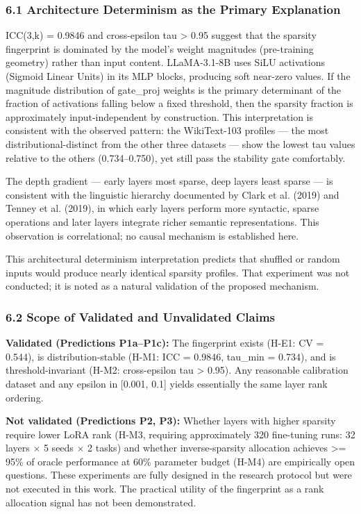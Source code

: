 
\subsubsection{6.1 Architecture Determinism as the Primary Explanation}

ICC(3,k) = 0.9846 and cross-epsilon tau > 0.95 suggest that the sparsity fingerprint is dominated by the model's weight magnitudes (pre-training geometry) rather than input content. LLaMA-3.1-8B uses SiLU activations (Sigmoid Linear Units) in its MLP blocks, producing soft near-zero values. If the magnitude distribution of gate\_proj weights is the primary determinant of the fraction of activations falling below a fixed threshold, then the sparsity fraction is approximately input-independent by construction. This interpretation is consistent with the observed pattern: the WikiText-103 profiles --- the most distributional-distinct from the other three datasets --- show the lowest tau values relative to the others (0.734--0.750), yet still pass the stability gate comfortably.

The depth gradient --- early layers most sparse, deep layers least sparse --- is consistent with the linguistic hierarchy documented by Clark et al. (2019) and Tenney et al. (2019), in which early layers perform more syntactic, sparse operations and later layers integrate richer semantic representations. This observation is correlational; no causal mechanism is established here.

This architectural determinism interpretation predicts that shuffled or random inputs would produce nearly identical sparsity profiles. That experiment was not conducted; it is noted as a natural validation of the proposed mechanism.

\subsubsection{6.2 Scope of Validated and Unvalidated Claims}

\textbf{Validated (Predictions P1a--P1c):} The fingerprint exists (H-E1: CV = 0.544), is distribution-stable (H-M1: ICC = 0.9846, tau\_min = 0.734), and is threshold-invariant (H-M2: cross-epsilon tau > 0.95). Any reasonable calibration dataset and any epsilon in [0.001, 0.1] yields essentially the same layer rank ordering.

\textbf{Not validated (Predictions P2, P3):} Whether layers with higher sparsity require lower LoRA rank (H-M3, requiring approximately 320 fine-tuning runs: 32 layers $\times$ 5 seeds $\times$ 2 tasks) and whether inverse-sparsity allocation achieves >= 95\% of oracle performance at 60\% parameter budget (H-M4) are empirically open questions. These experiments are fully designed in the research protocol but were not executed in this work. The practical utility of the fingerprint as a rank allocation signal has not been demonstrated.

